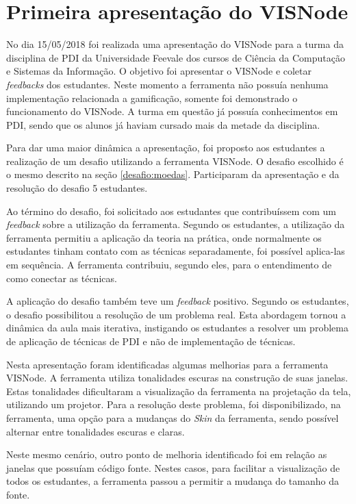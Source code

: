\documentclass[
	12pt,				%
	oneside,			%
	a4paper,			%
	english,			%
	french,				%
	spanish,			%
	brazil,				%
	]{abntex2}
\begin{document}
\section{Primeira apresentação do VISNode}
\label{validacao:piloto1}

No dia 15/05/2018 foi realizada uma apresentação do VISNode para a turma da disciplina de PDI da Universidade Feevale dos cursos de Ciência da Computação e Sistemas da Informação. O objetivo  foi apresentar o VISNode e coletar \textit{feedbacks} dos estudantes. Neste momento a ferramenta não possuía nenhuma implementação relacionada a gamificação, somente foi demonstrado o funcionamento do VISNode. A turma em questão já possuía conhecimentos em PDI, sendo que os alunos já haviam cursado mais da metade da disciplina.

Para dar uma maior dinâmica a apresentação, foi proposto aos estudantes a realização de um desafio utilizando a ferramenta VISNode. O desafio escolhido é o mesmo descrito na seção \ref{desafio:moedas}. Participaram da apresentação e da resolução do desafio 5 estudantes.

Ao término do desafio, foi solicitado aos estudantes que contribuíssem com um \textit{feedback} sobre a utilização da ferramenta. Segundo os estudantes, a utilização da ferramenta permitiu a aplicação da teoria na prática, onde normalmente os estudantes tinham contato com as técnicas separadamente, foi possível aplica-las em sequência. A ferramenta contribuiu, segundo eles, para o entendimento de como conectar as técnicas.

A aplicação do desafio também teve um \textit{feedback} positivo. Segundo os estudantes, o desafio possibilitou a resolução de um problema real. Esta abordagem tornou a dinâmica da aula mais iterativa, instigando os estudantes a resolver um problema de aplicação de técnicas de PDI e não de implementação de técnicas.

Nesta apresentação foram identificadas algumas melhorias para a ferramenta VISNode. A ferramenta utiliza tonalidades escuras na construção de suas janelas. Estas tonalidades dificultaram a visualização da ferramenta na projetação da tela, utilizando um projetor. Para a resolução deste problema, foi disponibilizado, na ferramenta, uma opção para a mudanças do \textit{Skin} da ferramenta, sendo possível alternar entre tonalidades escuras e claras.

Neste mesmo cenário, outro ponto de melhoria identificado foi em relação as janelas que possuíam código fonte. Nestes casos, para facilitar a visualização de todos os estudantes, a ferramenta  passou a permitir a mudança do tamanho da fonte.
\end{document}

